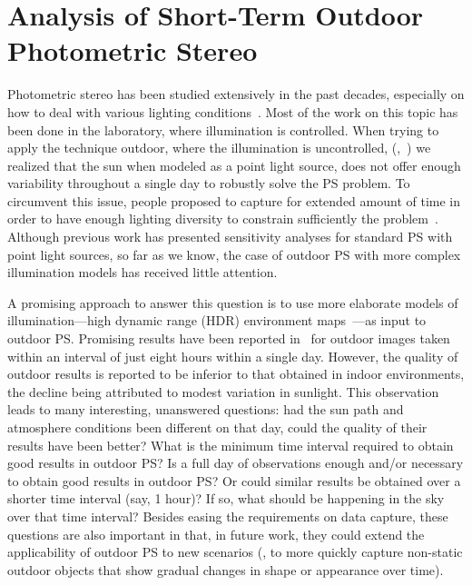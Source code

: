 \chapter{Analysis of Short-Term Outdoor Photometric Stereo}     %

\label{ch1}


Photometric stereo has been studied extensively in the past decades, especially on how to deal with various lighting conditions~\cite{alldrin-cvpr-08,basri-ijcv-07,johnson-cvpr-11,oxholm-eccv-12,ackermann-cvpr-12,abrams-eccv-12}. Most of the work on this topic has been done in the laboratory, where illumination is controlled. When trying to apply the technique outdoor, where the illumination is uncontrolled,
(\eg,~\cite{sun-ivc-07,jiang-bunke-sp-91,klaudiny-prl-14,shen-pg-14})
we realized that the sun when modeled as a point light source, does not offer enough variability throughout a single day to robustly solve the PS problem. To circumvent this issue, people proposed to capture for extended amount of time in order to have enough lighting diversity to constrain sufficiently the problem~\cite{ackermann-cvpr-12,abrams-eccv-12}. Although previous work has presented sensitivity analyses for standard PS with point light sources, so far as we know, the case of outdoor PS with more complex illumination models has received little attention. 

A promising approach to answer this question is to use more elaborate models of illumination---high dynamic range (HDR) environment maps~\cite{reinhard-book-05}---as input to outdoor PS. Promising results have been reported in~\cite{yu-iccp-13} for outdoor images taken within an interval of just eight hours within a single day. However, the quality of outdoor results is reported to be inferior to that obtained in indoor environments, the decline being attributed to modest variation in sunlight. This observation leads to many interesting, unanswered questions: had the sun path and atmosphere conditions been different on that day, could the quality of their results have been better? What is the minimum time interval required to obtain good results in outdoor PS? Is a full day of observations enough and/or necessary to obtain good results in outdoor PS? Or could similar results be obtained over a shorter time interval (say, 1 hour)? If so, what should be happening in the sky over that time interval? Besides easing the requirements on data capture, these questions are also important in that, in future work, they could extend the applicability of outdoor PS to new scenarios (\eg, to more quickly capture non-static outdoor objects that show gradual changes in shape or appearance over time). 

